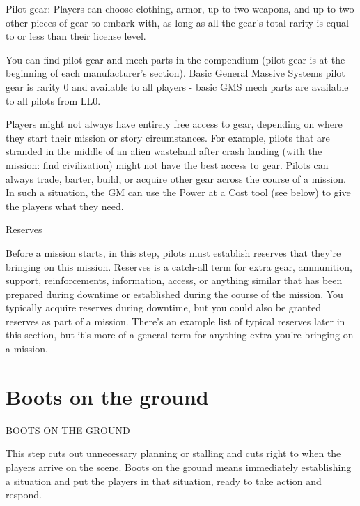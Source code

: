 Pilot gear: Players can choose clothing, armor, up to two weapons, and up to two other  
pieces of gear to embark with, as long as all the gear’s total rarity is equal to or less than their  
license level.
 

You can find pilot gear and mech parts in the compendium (pilot gear is at the beginning of each  
manufacturer’s section). Basic General Massive Systems pilot gear is rarity 0 and available to all  
players - basic GMS mech parts are available to all pilots from LL0.
 

                                                                                                                   


Players might not always have entirely free access to gear, depending on where they start their  
mission or story circumstances. For example, pilots that are stranded in the middle of an alien  
wasteland after crash landing (with the mission: find civilization) might not have the best access  
to gear. Pilots can always trade, barter, build, or acquire other gear across the course of a  
mission. In such a situation, the GM can use the Power at a Cost tool (see below) to give the  
players what they need.
 

                                                    Reserves
 

Before a mission starts, in this step, pilots must establish reserves that they’re bringing on this  
mission. Reserves is a catch-all term for extra gear, ammunition, support, reinforcements,  
information, access, or anything similar that has been prepared during downtime or established  
during the course of the mission. You typically acquire reserves during downtime, but you could  
also be granted reserves as part of a mission. There’s an example list of typical reserves later in  
this section, but it’s more of a general term for anything extra you’re bringing on a mission.
 
\chapter{Boots on the ground}
                                  BOOTS ON THE GROUND
 

This step cuts out unnecessary planning or stalling and cuts right to when the players arrive on  
the scene. Boots on the ground means immediately establishing a situation and put the players  
in that situation, ready to take action and respond. 
 

